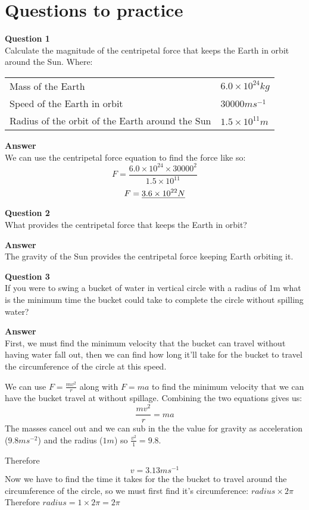\documentclass{article}
\begin{document}
\section*{Questions to practice}
\textbf{Question 1}\\
Calculate the magnitude of the centripetal force that keeps the Earth in orbit
around the Sun.
Where:
\begin{center}
	\begin{tabular}{ l l }
		Mass of the Earth & $6.0\times10^{24}kg$ \\
		Speed of the Earth in orbit & $30000ms^{-1}$ \\
		Radius of the orbit of the Earth around the Sun & $1.5\times10^{11}m$
	\end{tabular}
\end{center}
\textbf{Answer}\\
We can use the centripetal force equation to find the force like so:
\[
	F = \frac{6.0\times10^{24} \times 30000^2}{1.5\times10^{11}}
\]
\[
	F = \uline{3.6 \times 10^{22}N}
\]

\textbf{Question 2}\\
What provides the centripetal force that keeps the Earth in orbit?

\textbf{Answer} \\
The gravity of the Sun provides the centripetal force keeping Earth orbiting it.

\textbf{Question 3}\\
If you were to swing a bucket of water in vertical circle with a radius of 1m
what is the minimum time the bucket could take to complete the circle without
spilling water?

\textbf{Answer} \\
First, we must find the minimum velocity that the bucket can travel without
having water fall out, then we can find how long it'll take for the bucket to
travel the circumference of the circle at this speed.

We can use $F = \frac{mv^2}{r}$ along with $F = ma$ to find the minimum velocity
that we can have the bucket travel at without spillage. Combining the two
equations gives us:
\[
	\frac{mv^2}{r} = ma
\]
The masses cancel out and we can sub in the the value for gravity as
acceleration ($9.8ms^{-2}$) and the radius ($1m$) so $\frac{v^2}{1} = 9.8$.

Therefore 
\[
	v = 3.13ms^{-1}
\]
Now we have to find the time it takes for the the bucket to travel around the
circumference of the circle, so we must first find it's circumference: $radius
\times 2\pi$ Therefore $radius = 1 \times 2\pi = 2\pi$
\end{document}

